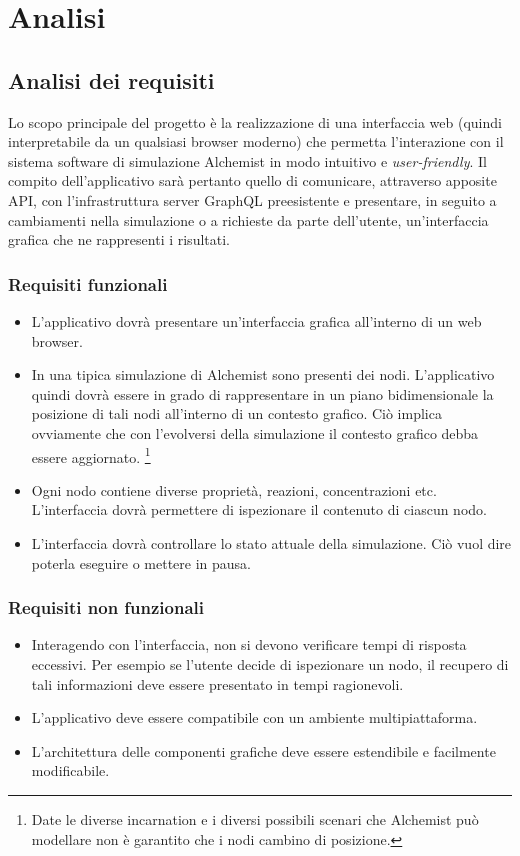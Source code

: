 \chapter{Analisi}

\section{Analisi dei requisiti}
Lo scopo principale del progetto è la realizzazione di una interfaccia web (quindi interpretabile da un qualsiasi browser moderno) che permetta l'interazione con il sistema software di simulazione
Alchemist in modo intuitivo e \textit{user-friendly}. Il compito dell'applicativo sarà pertanto quello di comunicare, attraverso apposite \ac{API}, con l'infrastruttura server GraphQL preesistente e presentare, in seguito a cambiamenti nella simulazione o a richieste da parte dell'utente, un'interfaccia grafica che ne rappresenti i risultati.
\subsection{Requisiti funzionali}
\begin{itemize}
	\item L'applicativo dovrà presentare un'interfaccia grafica all'interno di un web browser.
	\item In una tipica simulazione di Alchemist sono presenti dei nodi. L'applicativo quindi dovrà essere in grado di rappresentare in un piano bidimensionale la posizione di tali nodi all'interno di un contesto grafico. Ciò implica ovviamente che con l'evolversi della simulazione il contesto grafico debba essere aggiornato. \footnote{Date le diverse incarnation e i diversi possibili scenari che Alchemist può modellare non è garantito che i nodi cambino di posizione.}
	\item Ogni nodo contiene diverse proprietà, reazioni, concentrazioni etc. L'interfaccia dovrà permettere di ispezionare il contenuto di ciascun nodo. 
	\item L'interfaccia dovrà controllare lo stato attuale della simulazione. Ciò vuol dire poterla eseguire o mettere in pausa.
\end{itemize}

\subsection{Requisiti non funzionali}
\begin{itemize}
	\item Interagendo con l'interfaccia, non si devono verificare tempi di risposta eccessivi. Per esempio se l'utente decide di ispezionare un nodo, il recupero di tali informazioni deve essere presentato in tempi ragionevoli.
	\item L'applicativo deve essere compatibile con un ambiente multipiattaforma.
	\item L'architettura delle componenti grafiche deve essere estendibile e facilmente modificabile.
\end{itemize}


